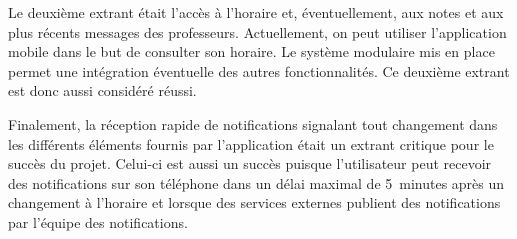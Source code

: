     Le deuxième extrant était l'accès à l'horaire et, éventuellement, aux notes et aux plus récents messages des professeurs. Actuellement, on peut utiliser l'application mobile dans le but de consulter son horaire. Le système modulaire mis en place permet une intégration éventuelle des autres fonctionnalités. Ce deuxième extrant est donc aussi considéré réussi.

    Finalement, la réception rapide de notifications signalant tout changement dans les différents éléments fournis par l'application était un extrant critique pour le succès du projet. Celui-ci est aussi un succès puisque l'utilisateur peut recevoir des notifications sur son téléphone dans un délai maximal de 5~minutes après un changement à l'horaire et lorsque des services externes publient des notifications par l'équipe des notifications.
    
    
    
    